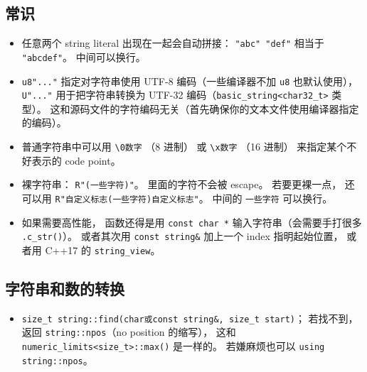 
\begin{issues}
\issueDraft
\end{issues}


\subsection{常识}
\begin{itemize}
\item 任意两个 string literal 出现在一起会自动拼接： \verb`"abc" "def"` 相当于 \verb|"abcdef"|。 中间可以换行。
\item \verb|u8"..."| 指定对字符串使用 UTF-8 编码（一些编译器不加 \verb|u8| 也默认使用）， \verb|U"..."| 用于把字符串转换为 UTF-32 编码（\verb|basic_string<char32_t>| 类型）。 这和源码文件的字符编码无关（首先确保你的文本文件使用编译器指定的编码）。
\item 普通字符串中可以用 \verb|\0数字| （8 进制） 或 \verb|\x数字| （16 进制） 来指定某个不好表示的 code point。
\item 裸字符串： \verb|R"(一些字符)"|。 里面的字符不会被 escape。 若要更裸一点， 还可以用 \verb|R"自定义标志(一些字符)自定义标志"|。 中间的 \verb|一些字符| 可以换行。
\item 如果需要高性能， 函数还得是用 \verb|const char *| 输入字符串（会需要手打很多 \verb|.c_str()|）。 或者其次用 \verb|const string&| 加上一个 index 指明起始位置， 或者用 C++17 的 \verb|string_view|。
\end{itemize}

\subsection{字符串和数的转换}

\begin{itemize}
\item \verb|size_t string::find(char或const string&, size_t start)|； 若找不到， 返回 \verb|string::npos|（no position 的缩写）， 这和 \verb|numeric_limits<size_t>::max()| 是一样的。 若嫌麻烦也可以 \verb|using string::npos|。
\end{itemize}


